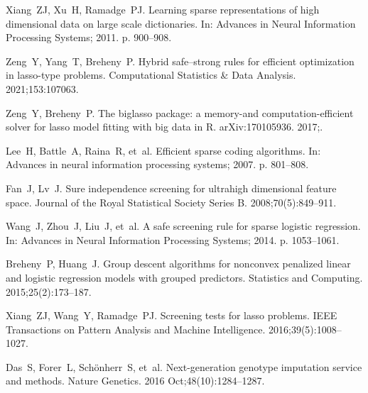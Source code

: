 \documentclass[]{interact}
\theoremstyle{plain}%
\theoremstyle{definition}
\theoremstyle{remark}
\begin{document}
\begin{thebibliography}{10}
Xiang~ZJ, Xu~H, Ramadge~PJ. Learning sparse representations of high dimensional
  data on large scale dictionaries. In: Advances in Neural Information
  Processing Systems; 2011. p. 900--908.

Zeng~Y, Yang~T, Breheny~P. Hybrid safe–strong rules for efficient
  optimization in lasso-type problems. Computational Statistics \& Data
  Analysis. 2021;\hspace{0pt}153:107063.

Zeng~Y, Breheny~P. The biglasso package: a memory-and computation-efficient
  solver for lasso model fitting with big data in {R}. arXiv:170105936.
  2017;\hspace{0pt}.

Lee~H, Battle~A, Raina~R, et~al. Efficient sparse coding algorithms. In:
  Advances in neural information processing systems; 2007. p. 801--808.

Fan~J, Lv~J. Sure independence screening for ultrahigh dimensional feature
  space. Journal of the Royal Statistical Society Series B.
  2008;\hspace{0pt}70(5):849--911.

Wang~J, Zhou~J, Liu~J, et~al. A safe screening rule for sparse logistic
  regression. In: Advances in Neural Information Processing Systems; 2014. p.
  1053--1061.

Breheny~P, Huang~J. Group descent algorithms for nonconvex penalized linear and
  logistic regression models with grouped predictors. Statistics and Computing.
  2015;\hspace{0pt}25(2):173--187.

Xiang~ZJ, Wang~Y, Ramadge~PJ. Screening tests for lasso problems. IEEE
  Transactions on Pattern Analysis and Machine Intelligence.
  2016;\hspace{0pt}39(5):1008--1027.

Das~S, Forer~L, Sch{\"o}nherr~S, et~al. Next-generation genotype imputation
  service and methods. Nature Genetics. 2016 Oct;\hspace{0pt}48(10):1284--1287.

\end{thebibliography}
\end{document}
